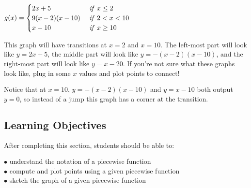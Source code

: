\documentclass{ximera}
\begin{document}
\begin{example}
$g(x)=\begin{cases} 2x+5 & \mbox{ \emph{if} }x\leq 2\\ 9(x-2)(x-10) & \mbox{ \emph{if} } 2<x<10\\ x-10 & \mbox{ \emph{if} } x\geq 10\end{cases}$

This graph will have transitions at $x=2$ and $x=10$. The left-most part will look like $y=2x+5$, the middle part will look like $y=-(x-2)(x-10)$, and the right-most part will look like $y=x-20$. If you're not sure what these graphs look like, plug in some $x$ values and plot points to connect!


Notice that at $x=10$, $y=-(x-2)(x-10)$ and $y=x-10$ both output $y=0$, so instead of a jump this graph has a corner at the transition.
\end{example}

\subsection*{Learning Objectives}
After completing this section, students should be able to:
\vspace{.05in}

\noindent$\bullet$ understand the notation of a piecewise function
\\$\bullet$ compute and plot points using a given piecewise function
\\$\bullet$ sketch the graph of a given piecewise function
\end{document}
